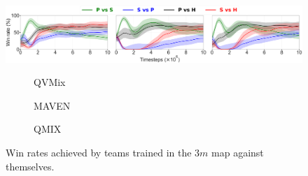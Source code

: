 \begin{subfigure}{\textwidth}
    \includegraphics[width=\textwidth]{tex_thesis/figures/ch7/tiny_perf_self_popu.pdf}
    \begin{subfigure}{.05\textwidth}
    \centering
    \caption*{}
    \end{subfigure}%
    \begin{subfigure}{.31\textwidth}
    \renewcommand\thesubfigure{\alph{subfigure}.1}
      \centering
      \caption{QVMix}
      \label{subfig:duo_methodQVMIX}
    \end{subfigure}%
    \begin{subfigure}{.31\textwidth}
    \addtocounter{subfigure}{-1}
    \renewcommand\thesubfigure{\alph{subfigure}.2}
      \centering
      \caption{MAVEN}
      \label{subfig:duo_methodMAVEN}
    \end{subfigure}%
    \begin{subfigure}{.31\textwidth}
    \addtocounter{subfigure}{-1}
    \renewcommand\thesubfigure{\alph{subfigure}.3}
      \centering
      \caption{QMIX}
      \label{subfig:duo_methodQMIX}
    \end{subfigure}
\addtocounter{subfigure}{-1}
\caption{Win rates achieved by teams trained in the $3m$ map against themselves.}
\label{subfig:3m_duo}
\end{subfigure}
